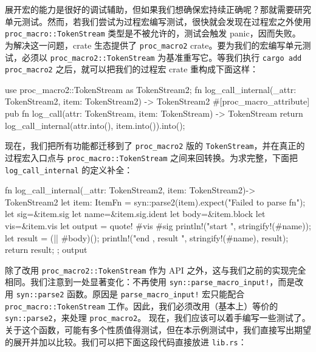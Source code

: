 \label{idx:idx_bb401ad3}
展开宏的能力是很好的调试辅助，但如果我们想确保宏持续正确呢？那就需要研究单元测试。然而，若我们尝试为过程宏编写测试，很快就会发现在过程宏之外使用 \texttt{proc\_\allowbreak{}macro::\allowbreak{}TokenStream} 类型是不被允许的，测试会触发 panic，因而失败。
\label{idx:idx_48828907}
为解决这一问题，crate 生态提供了 \texttt{proc\_\allowbreak{}macro2} crate。要为我们的宏编写单元测试，必须以 \texttt{proc\_\allowbreak{}macro2::\allowbreak{}TokenStream} 为基准重写它。等我们执行 \texttt{cargo add}
\texttt{proc\_\allowbreak{}macro2} 之后，就可以把我们的过程宏 crate 重构成下面这样：
\begin{codebox}[rust]
use proc_macro2::TokenStream as TokenStream2;
fn log_call_internal(_attr: TokenStream2, item: TokenStream2) -> TokenStream2 {
}
#[proc_macro_attribute]
pub fn log_call(attr: TokenStream, item: TokenStream) -> TokenStream {
    return log_call_internal(attr.into(), item.into()).into();
}
\end{codebox}
现在，我们把所有功能都迁移到了 \texttt{proc\_\allowbreak{}macro2} 版的 \texttt{TokenStream}，并在真正的过程宏入口点与 \texttt{proc\_\allowbreak{}macro::\allowbreak{}TokenStream} 之间来回转换。为求完整，下面把 \texttt{log\_\allowbreak{}call\_\allowbreak{}internal} 的定义补全：
\begin{codebox}[rust]
fn log_call_internal(_attr: TokenStream2, item: TokenStream2)-> TokenStream2 {
    let item: ItemFn = syn::parse2(item).expect("Failed to parse fn");
    let sig=&item.sig
    let name=&item.sig.ident
    let body=&item.block
    let vis=&item.vis
    let output = quote! {
        #vis #sig {
            println!("start {}", stringify!(#name));
            let result = (|| #body)();
            println!("end {}, result {}", stringify!(#name), result);
            return result;
        }
    };
    output
}
\end{codebox}
\label{idx:idx_73f414fc}
\label{idx:idx_0065ea76}
除了改用 \texttt{proc\_\allowbreak{}macro2::\allowbreak{}TokenStream} 作为 API 之外，这与我们之前的实现完全相同。我们注意到一处显著变化：不再使用 \texttt{syn::\allowbreak{}parse\_\allowbreak{}macro\_\allowbreak{}input!}，而是改用 \texttt{syn::parse2} 函数。原因是 \texttt{parse\_\allowbreak{}macro\_\allowbreak{}input!} 宏只能配合 \texttt{proc\_\allowbreak{}macro::\allowbreak{}TokenStream} 工作。因此，我们必须改用（基本上）等价的
\texttt{syn::parse2}，来处理 \texttt{proc\_\allowbreak{}macro2}。
现在，我们应该可以着手编写一些测试了。关于这个函数，可能有多个性质值得测试，但在本示例测试中，我们直接写出期望的展开并加以比较。我们可以把下面这段代码直接放进 \texttt{lib.rs}：
